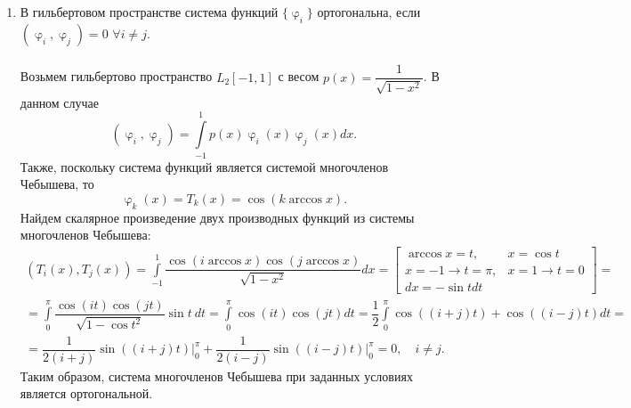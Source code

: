 \documentclass[a4paper, 12pt]{article}
\renewcommand{\varphi}{\upvarphi}
\begin{document}
\begin{enumerate}
		\newpage
		\item 
		\hypertarget{t3}{}
		В гильбертовом пространстве система функций $\{\varphi_i\}$ ортогональна, если $(\varphi_i, \varphi_j) =0$ $\forall i\ne j$. \\\\
		Возьмем гильбертово пространство $L_2[-1,1]$ с весом $p(x) = \dfrac{1}{\sqrt{1-x^2}}$. В данном случае $$(\varphi_i, \varphi_j) = \int\limits_{-1}^1 p(x)\varphi_i(x)\varphi_j(x) dx.$$
		Также, поскольку система функций является системой многочленов Чебышева, то $$\varphi_k(x) = T_k(x) = \cos (k\arccos x).$$
		Найдем скалярное произведение двух производных функций из системы многочленов Чебышева:
		\begin{multline*}
			(T_i(x), T_j(x)) = \int\limits_{-1}^1 \dfrac{\cos (i\arccos x)\cos(j \arccos x)}{\sqrt{1-x^2}} dx = \left[\begin{matrix}
				\arccos x = t, & x = \cos t\\
				x=-1 \to t=\pi, & x=1 \to t = 0\\
				dx = -\sin t dt
			\end{matrix}\right] =\\ = \int\limits_{0}^\pi \dfrac{\cos (it)\cos(j t)}{\sqrt{1-\cos t^2}}\sin t\ dt = \int\limits_{0}^\pi \cos (it)\cos(j t) dt = \dfrac12\int\limits_{0}^\pi \cos ((i+j)t)+\cos((i-j) t) dt=\\= \dfrac{1}{2(i+j)}\sin ((i+j)t)\Big|_0^\pi + \dfrac{1}{2(i-j)}\sin ((i-j)t)\Big|_0^\pi = 0,\quad i \ne j.
		\end{multline*}
		Таким образом, система многочленов Чебышева при заданных условиях является ортогональной.
	\end{enumerate}
	
\end{document}
